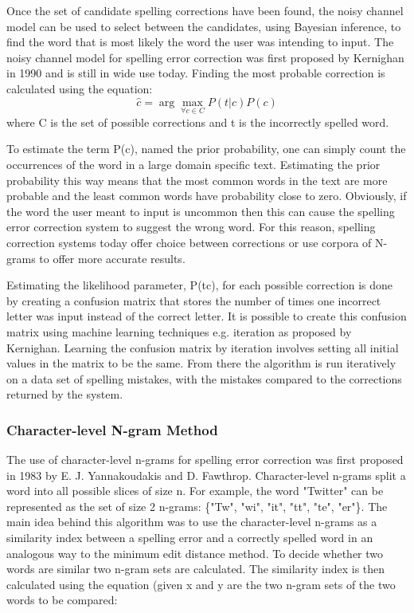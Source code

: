 Once the set of candidate spelling corrections have been found, the noisy channel model can be used to select between the candidates, using Bayesian inference, to find the word that is most likely the word the user was intending to input. The noisy channel model for spelling error correction was first proposed by Kernighan in 1990 \cite{Kernighan1990} and is still in wide use today. Finding the most probable correction is calculated using the equation:
\[
\hat{c} = \arg\max_{\forall c \in C} P(t|c) P(c)
\]
where C is the set of possible corrections and t is the incorrectly spelled word.

To estimate the term P(c), named the prior probability, one can simply count the occurrences of the word in a large domain specific text. Estimating the prior probability this way means that the most common words in the text are more probable and the least common words have probability close to zero. Obviously, if the word the user meant to input is uncommon then this can cause the spelling error correction system to suggest the wrong word. For this reason, spelling correction systems today offer choice between corrections or use corpora of N-grams to offer more accurate results.

Estimating the likelihood parameter, P(t\textbar c), for each possible correction is done by creating a confusion matrix that stores the number of times one incorrect letter was input instead of the correct letter. It is possible to create this confusion matrix using machine learning techniques e.g. iteration as proposed by Kernighan.\cite{Kernighan1990} Learning the confusion matrix by iteration involves setting all initial values in the matrix to be the same. From there the algorithm is run iteratively on a data set of spelling mistakes, with the mistakes compared to the corrections returned by the system.

\subsubsection{Character-level N-gram Method}

The use of character-level n-grams for spelling error correction was first proposed in 1983 by E. J. Yannakoudakis and D. Fawthrop. Character-level n-grams split a word into all possible slices of size n. For example, the word "Twitter" can be represented as the set of size 2 n-grams: \{"Tw", "wi", "it", "tt", "te", "er"\}. The main idea behind this algorithm was to use the character-level n-grams as a similarity index between a spelling error and a correctly spelled word in an analogous way to the minimum edit distance method. To decide whether two words are similar two n-gram sets are calculated. The similarity index is then calculated using the equation (given x and y are the two n-gram sets of the two words to be compared:

